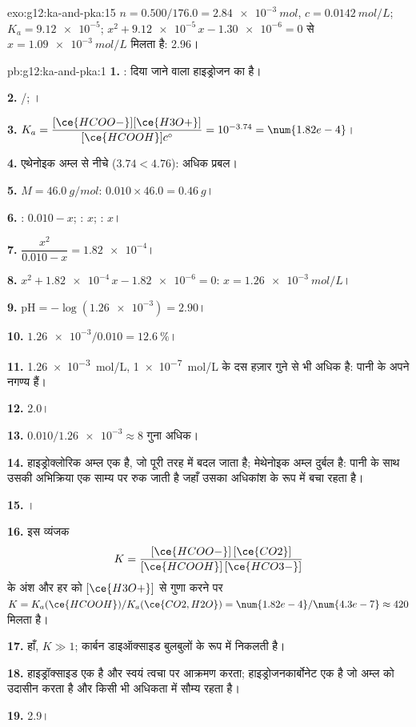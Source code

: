 \begin{solution}{exo:g12:ka-and-pka:15}
$n = 0.500 / 176.0 = \qty{2.84e-3}{mol}$, $c = \qty{0.0142}{mol/L}$;
$K_a = \num{9.12e-5}$; $x^2 + \num{9.12e-5}\,x - \num{1.30e-6} = 0$ से
$x = \qty{1.09e-3}{mol/L}$ मिलता है:  2.96।
\end{solution}

\begin{solution}{pb:g12:ka-and-pka:1}
\textbf{1.} : दिया जाने वाला हाइड्रोजन  का है।

\textbf{2.} /; ।

\textbf{3.} $K_a = \dfrac{[\ce{HCOO-}][\ce{H3O+}]}{[\ce{HCOOH}]c^\circ} =
10^{-3.74} = \num{1.82e-4}$।

\textbf{4.} एथेनोइक अम्ल से नीचे ($3.74 < 4.76$): अधिक प्रबल।

\textbf{5.} $M = \qty{46.0}{g/mol}$: $0.010 \times 46.0 = \qty{0.46}{g}$।

\textbf{6.} : $0.010 - x$; : $x$; : $x$।

\textbf{7.} $\dfrac{x^2}{0.010 - x} = \num{1.82e-4}$।

\textbf{8.} $x^2 + \num{1.82e-4}\,x - \num{1.82e-6} = 0$:
$x = \qty{1.26e-3}{mol/L}$।

\textbf{9.} $\mathrm{pH} = -\log(\num{1.26e-3}) = 2.90$।

\textbf{10.} $\num{1.26e-3}/0.010 = \qty{12.6}{\percent}$।

\textbf{11.} \qty{1.26e-3}{mol/L}, \qty{1e-7}{mol/L} के दस हज़ार गुने से
भी अधिक है: पानी के अपने  नगण्य हैं।

\textbf{12.}  2.0।

\textbf{13.} $0.010 / \num{1.26e-3} \approx 8$ गुना अधिक।

\textbf{14.} हाइड्रोक्लोरिक अम्ल एक  है, जो पूरी तरह  में
बदल जाता है; मेथेनोइक अम्ल दुर्बल है: पानी के साथ उसकी अभिक्रिया एक
साम्य पर रुक जाती है जहाँ उसका अधिकांश  के रूप में बचा रहता है।

\textbf{15.} ।

\textbf{16.} इस व्यंजक
\[
  K = \frac{[\ce{HCOO-}]\,[\ce{CO2}]}{[\ce{HCOOH}]\,[\ce{HCO3-}]}
\]
के अंश और हर को $[\ce{H3O+}]$ से गुणा करने पर $K = K_a(\ce{HCOOH}) / K_a(\ce{CO2,H2O}) =
\num{1.82e-4}/\num{4.3e-7} \approx 420$ मिलता है।

\textbf{17.} हाँ, $K \gg 1$; कार्बन डाइऑक्साइड बुलबुलों के रूप में निकलती है।

\textbf{18.} हाइड्रॉक्साइड एक  है और स्वयं त्वचा पर आक्रमण करता;
हाइड्रोजनकार्बोनेट एक  है जो अम्ल को उदासीन करता है और
किसी भी अधिकता में सौम्य रहता है।

\textbf{19.}  2.9।
\end{solution}
